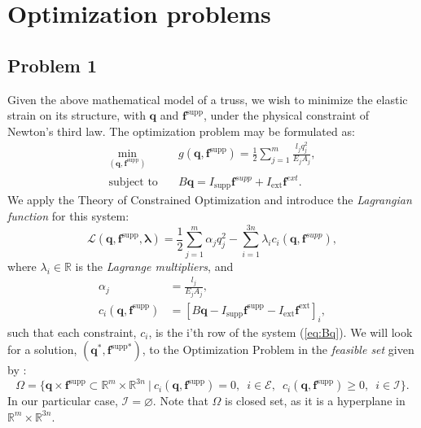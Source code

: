 \documentclass[10pt,a4paper]{article}
\begin{document}
\section{Optimization problems}
\subsection{Problem 1}
Given the above mathematical model of a truss, we wish to minimize the elastic strain on its structure, with $\boldsymbol{q}$ and $\boldsymbol{f}^{\text{supp}}$, under the physical constraint of Newton's third law. The optimization problem may be formulated as:
\begin{align}
\min\limits_{(\boldsymbol{q},\boldsymbol{f}^{\text{supp}})}\quad&g(\boldsymbol{q},\boldsymbol{f}^\text{supp})=\frac{1}{2}\sum_{j=1}^m \frac{l_j q_j^2}{E_j A_j} ,\label{eq:min g}\\
\text{subject to} \quad &B\boldsymbol{q} = I_\text{supp}\boldsymbol{f}^{supp}+I_\text{ext}\boldsymbol{f}^{ext}.\label{eq:Bq}
\end{align}
We apply the Theory of Constrained Optimization and introduce the \textit{Lagrangian function} for this system:
\begin{equation*}
\mathcal{L}\left(\boldsymbol{q},\boldsymbol{f}^{\text{supp}},\boldsymbol{\lambda}\right) = \frac{1}{2}\sum_{j=1}^m \alpha_j q_{j}^2 - \sum_{i=1}^{3n}\lambda_i c_i\left(\boldsymbol{q},\boldsymbol{f}^{supp}\right),
\end{equation*}
where $\lambda_i \in \mathbb{R}$ is the \textit{Lagrange multipliers}, and 
\begin{align*}
\alpha_j &= \frac{l_j}{E_j A_j}, \\
c_i\left(\boldsymbol{q},\boldsymbol{f}^\text{supp}\right) &= \left[ B\boldsymbol{q} - I_\text{supp}\boldsymbol{f}^\text{supp}-I_\text{ext}\boldsymbol{f}^\text{ext} \right]_i ,
\end{align*}
such that each constraint, $c_i$, is the i'th row of the system (\ref{eq:Bq}). We will look for a solution, $\left(\boldsymbol{q}^*,\boldsymbol{f}^\text{supp*}\right)$, to the Optimization Problem in the \textit{feasible set} given by :
\begin{equation*}
\Omega = \lbrace \boldsymbol{q} \times \boldsymbol{f}^\text{supp} \subset \mathbb{R}^m \times \mathbb{R}^{3n} \ | \ c_i\left(\boldsymbol{q},\boldsymbol{f}^\text{supp}\right) = 0, \enspace i \in \mathcal{E},\enspace c_i\left(\boldsymbol{q},\boldsymbol{f}^\text{supp}\right) \geq 0, \enspace i \in \mathcal{I} \rbrace.
\end{equation*}
In our particular case, $\mathcal{I}=\varnothing$. Note that $\Omega$ is closed set, as it is a hyperplane in $\mathbb{R}^m \times \mathbb{R}^{3n}$.
\end{document}
